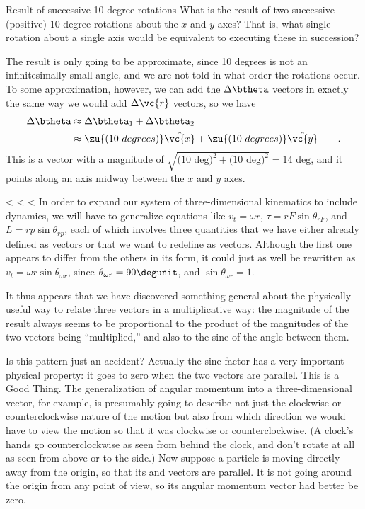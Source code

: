\begin{eg}{Result of successive 10-degree rotations}
\egquestion
What is the result of two successive (positive)
10-degree rotations about the $x$ and  $y$ axes? That is, what
single rotation about a single axis would be equivalent to
executing these in succession?

\eganswer
The result is only going to be approximate, since
10 degrees is not an infinitesimally small angle, and we are
not told in what order the rotations occur. To some
approximation, however, we can add the $\Delta\btheta$ vectors in exactly
the same way we would add $\Delta \vc{r}$ vectors, so we
have
\begin{align*}
        \Delta\btheta        &\approx  \Delta\btheta_1 +  \Delta\btheta_2 \\
                &\approx  \zu{(10\ degrees)}\hat{\vc{x}} + \zu{(10\ degrees)}\hat{\vc{y}}   \qquad .
\end{align*}
This is a vector with a magnitude of  
$\sqrt{\text{(10 deg)}^2+\text{(10 deg)}^2}=\text{14\ deg}$, and it
points along an axis midway between the $x$ and $y$ axes.
\end{eg}

<%
<%
<%
In order to expand our system of three-dimensional
kinematics to include dynamics, we will have to generalize
equations like $v_t=\omega r$,
$\tau=rF \sin\theta_{rF}$, and $L=rp \sin\theta_{rp}$, each of which
involves three quantities that we have either already
defined as vectors or that we want to redefine as vectors.
Although the first one appears to differ from the others in
its form, it could just as well be rewritten as $v_t=\omega r \sin\theta_{\omega r}$, since $\theta_{\omega r}=90\degunit$, and
$\sin\theta_{\omega r}=1$.

It thus appears that we have discovered something general
about the physically useful way to relate three vectors in a
multiplicative way: the magnitude of the result always seems
to be proportional to the product of the magnitudes of the
two vectors being ``multiplied,'' and also to the sine of
the angle between them.

Is this pattern just an accident? Actually the sine factor
has a very important physical property: it goes to zero when
the two vectors are parallel. This is a Good Thing. The
generalization of angular momentum into a three-dimensional
vector, for example, is presumably going to describe not
just the clockwise or counterclockwise nature of the motion
but also from which direction we would have to view the
motion so that it was clockwise or counterclockwise. (A
clock's hands go counterclockwise as seen from behind the
clock, and don't rotate at all as seen from above or to the
side.) Now suppose a particle is moving directly away from
the origin, so that its  and  vectors are parallel. It is
not going around the origin from any point of view, so its
angular momentum vector had better be zero.

